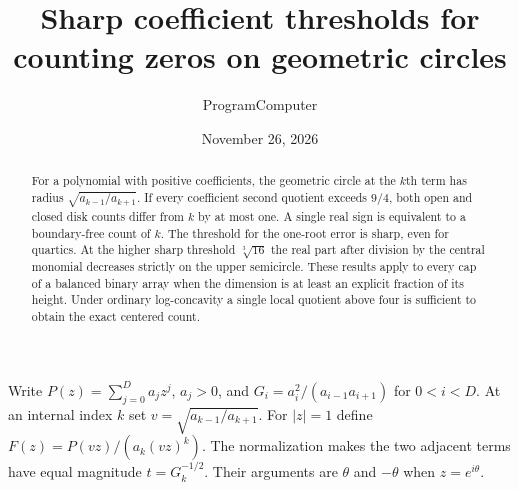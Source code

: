 \documentclass[11pt]{article}
\title{Sharp coefficient thresholds for counting zeros on geometric circles}
\author{ProgramComputer}
\date{November 26, 2026}
\begin{document}
\maketitle
\begin{abstract}
For a polynomial with positive coefficients, the geometric circle at the $k$th term has radius $\sqrt{a_{k-1}/a_{k+1}}$. If every coefficient second quotient exceeds $9/4$, both open and closed disk counts differ from $k$ by at most one. A single real sign is equivalent to a boundary-free count of $k$. The threshold for the one-root error is sharp, even for quartics. At the higher sharp threshold $\sqrt[3]{16}$ the real part after division by the central monomial decreases strictly on the upper semicircle. These results apply to every cap of a balanced binary array when the dimension is at least an explicit fraction of its height. Under ordinary log-concavity a single local quotient above four is sufficient to obtain the exact centered count.
\end{abstract}

Write $P(z)=\sum_{j=0}^D a_j z^j$, $a_j>0$, and $G_i=a_i^2/(a_{i-1}a_{i+1})$ for $0<i<D$. At an internal index $k$ set $v=\sqrt{a_{k-1}/a_{k+1}}$. For $|z|=1$ define $F(z)=P(vz)/(a_k(vz)^k)$. The normalization makes the two adjacent terms have equal magnitude $t=G_k^{-1/2}$. Their arguments are $\theta$ and $-\theta$ when $z=e^{i\theta}$.
\end{document}
